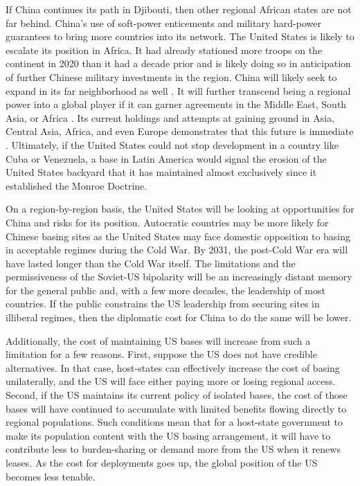 If China continues its path in Djibouti, then other regional African states are not far behind. China's use of soft-power enticements and military hard-power guarantees to bring more countries into its network. The United States is likely to escalate its position in Africa. It had already stationed more troops on the continent in 2020 than it had a decade prior and is likely doing so in anticipation of further Chinese military investments in the region. China will likely seek to expand in its far neighborhood as well \cite{OSD2020}. It will further transcend being a regional power into a global player if it can garner agreements in the Middle East, South Asia, or Africa \cite{yung2014,cabestan2020}. Its current holdings and attempts at gaining ground in Asia, Central Asia, Africa, and even Europe demonstrates that this future is immediate \cite{Doshi2021}. Ultimately, if the United States could not stop development in a country like Cuba or Venezuela, a base in Latin America would signal the erosion of the United States backyard that it has maintained almost exclusively since it established the Monroe Doctrine. 

On a region-by-region basis, the United States will be looking at opportunities for China and risks for its position. Autocratic countries may be more likely for Chinese basing sites as the United States may face domestic opposition to basing in acceptable regimes during the Cold War. By 2031, the post-Cold War era will have lasted longer than the Cold War itself. The limitations and the permissiveness of the Soviet-US bipolarity will be an increasingly distant memory for the general public and, with a few more decades, the leadership of most countries. If the public constrains the US leadership from securing sites in illiberal regimes, then the diplomatic cost for China to do the same will be lower.

Additionally, the cost of maintaining US bases will increase from such a limitation for a few reasons. First, suppose the US does not have credible alternatives. In that case, host-states can effectively increase the cost of basing unilaterally, and the US will face either paying more or losing regional access. Second, if the US maintains its current policy of isolated bases, the cost of those bases will have continued to accumulate with limited benefits flowing directly to regional populations. Such conditions mean that for a host-state government to make its population content with the US basing arrangement, it will have to contribute less to burden-sharing or demand more from the US when it renews leases. As the cost for deployments goes up, the global position of the US becomes less tenable. 


